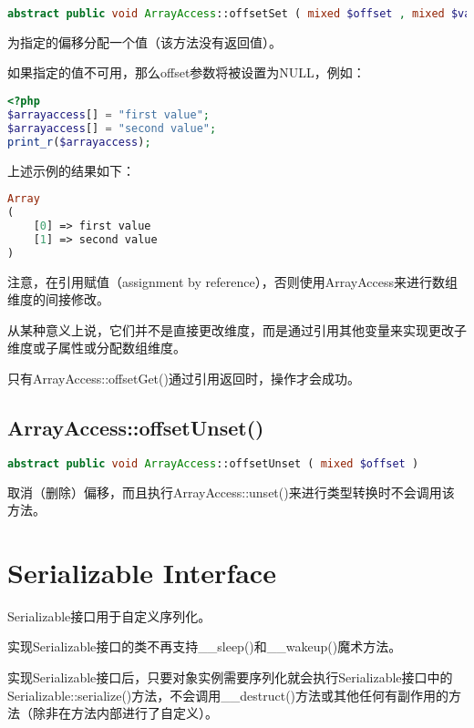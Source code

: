\begin{lstlisting}[language=PHP]
abstract public void ArrayAccess::offsetSet ( mixed $offset , mixed $value )
\end{lstlisting}

为指定的偏移分配一个值（该方法没有返回值）。

如果指定的值不可用，那么offset参数将被设置为NULL，例如：



\begin{lstlisting}[language=PHP]
<?php
$arrayaccess[] = "first value";
$arrayaccess[] = "second value";
print_r($arrayaccess);
\end{lstlisting}

上述示例的结果如下：

\begin{lstlisting}[language=PHP]
Array
(
    [0] => first value
    [1] => second value
)
\end{lstlisting}

注意，在引用赋值（assignment by reference），否则使用ArrayAccess来进行数组维度的间接修改。

从某种意义上说，它们并不是直接更改维度，而是通过引用其他变量来实现更改子维度或子属性或分配数组维度。

只有ArrayAccess::offsetGet()通过引用返回时，操作才会成功。

\section{ArrayAccess::offsetUnset()}



\begin{lstlisting}[language=PHP]
abstract public void ArrayAccess::offsetUnset ( mixed $offset )
\end{lstlisting}

取消（删除）偏移，而且执行ArrayAccess::unset()来进行类型转换时不会调用该方法。




\chapter{Serializable Interface}

Serializable接口用于自定义序列化。

实现Serializable接口的类不再支持\_\_sleep()和\_\_wakeup()魔术方法。

实现Serializable接口后，只要对象实例需要序列化就会执行Serializable接口中的Serializable::serialize()方法，不会调用\_\_destruct()方法或其他任何有副作用的方法（除非在方法内部进行了自定义）。

